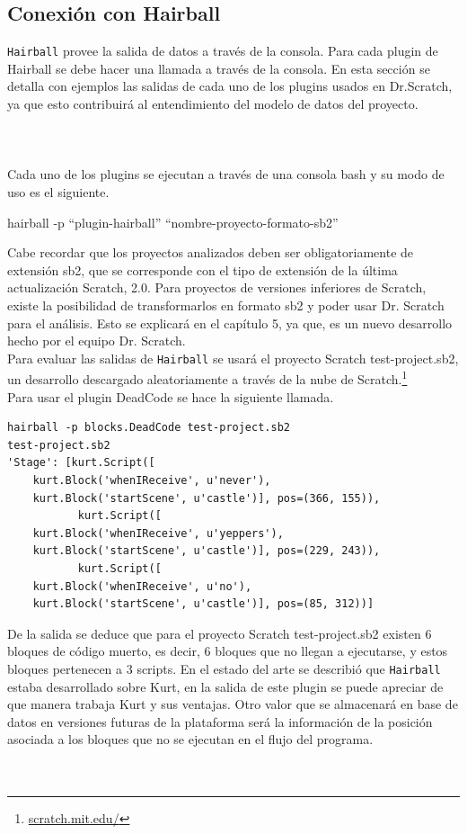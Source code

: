 \documentclass[a4paper, 12pt]{book}
\begin{document}
\subsection{Conexión con Hairball}
\texttt{Hairball} provee la salida de datos a través de la consola. Para cada plugin de Hairball se 
debe hacer una llamada a través de la consola. En esta sección se detalla con ejemplos las salidas 
de cada uno de los plugins usados en Dr.Scratch, ya que esto contribuirá al entendimiento del modelo 
de datos del proyecto. \\ \\ \\ \\

Cada uno de los plugins se ejecutan a través de una consola bash y su modo de uso es el siguiente.

\begin{center}
hairball -p "`plugin-hairball"' "`nombre-proyecto-formato-sb2"'
\end{center}

Cabe recordar que los proyectos analizados deben ser obligatoriamente de extensión sb2, que se 
corresponde con el tipo de extensión de la última actualización Scratch, 2.0. Para proyectos de 
versiones inferiores de Scratch, existe la posibilidad de transformarlos en formato sb2 y poder
usar Dr. Scratch para el análisis. Esto se explicará en el capítulo 5, ya que, es un nuevo
desarrollo hecho por el equipo Dr. Scratch. \\

Para evaluar las salidas de \texttt{Hairball} se usará el proyecto Scratch test-project.sb2, 
un desarrollo descargado aleatoriamente a través de la nube de 
Scratch.\footnote{\url{scratch.mit.edu/}} \\

Para usar el plugin DeadCode se hace la siguiente llamada.
\begingroup
\fontsize{8pt}{9pt}\selectfont
\begin{verbatim}
hairball -p blocks.DeadCode test-project.sb2 
test-project.sb2 
'Stage': [kurt.Script([ 
    kurt.Block('whenIReceive', u'never'), 
    kurt.Block('startScene', u'castle')], pos=(366, 155)), 
           kurt.Script([  
    kurt.Block('whenIReceive', u'yeppers'), 
    kurt.Block('startScene', u'castle')], pos=(229, 243)), 
           kurt.Script([ 
    kurt.Block('whenIReceive', u'no'), 
    kurt.Block('startScene', u'castle')], pos=(85, 312))] 
\end{verbatim}
\endgroup

De la salida se deduce que para el proyecto Scratch test-project.sb2 existen 6 bloques de código
muerto, es decir, 6 bloques que no llegan a ejecutarse, y estos bloques pertenecen a 3 scripts. 
En el estado del arte se describió que \texttt{Hairball} estaba desarrollado sobre Kurt, en la
salida de este plugin se puede apreciar de que manera trabaja Kurt y sus ventajas. Otro valor
que se almacenará en base de datos en versiones futuras de la plataforma será la información de 
la posición asociada a los bloques que no se ejecutan en el flujo del programa. \\ \\ \\
\end{document}

